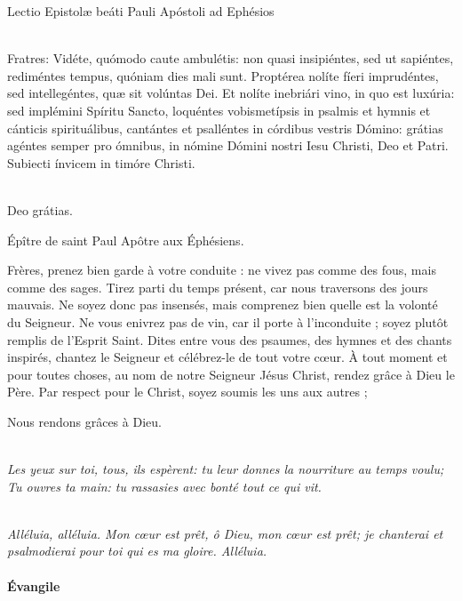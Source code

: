 \documentclass[twoside]{article}
\begin{document}
\begin{paracol}{2}
Lectio Epistolæ beáti Pauli Apóstoli ad Ephésios

\\
Fratres: Vidéte, quómodo caute ambulétis: non quasi insipiéntes, sed ut sapiéntes, rediméntes tempus, quóniam dies mali sunt. Proptérea nolíte fíeri imprudéntes, sed intellegéntes, quæ sit volúntas Dei. Et nolíte inebriári vino, in quo est luxúria: sed implémini Spíritu Sancto, loquéntes vobismetípsis in psalmis et hymnis et cánticis spirituálibus, cantántes et psalléntes in córdibus vestris Dómino: grátias agéntes semper pro ómnibus, in nómine Dómini nostri Iesu Christi, Deo et Patri. Subiecti ínvicem in timóre Christi.

\\
\rr Deo grátias.

\switchcolumn
Épître de saint Paul Apôtre aux Éphésiens.

Frères, prenez bien garde à votre conduite : ne vivez pas comme des fous, mais comme des sages.
Tirez parti du temps présent, car nous traversons des jours mauvais.
Ne soyez donc pas insensés, mais comprenez bien quelle est la volonté du Seigneur.
Ne vous enivrez pas de vin, car il porte à l’inconduite ; soyez plutôt remplis de l’Esprit Saint.
Dites entre vous des psaumes, des hymnes et des chants inspirés, chantez le Seigneur et célébrez-le de tout votre cœur.
À tout moment et pour toutes choses, au nom de notre Seigneur Jésus Christ, rendez grâce à Dieu le Père.
Par respect pour le Christ, soyez soumis les uns aux autres ;

\rr Nous rendons grâces à Dieu.

\end{paracol}


\\
\emph{\rr Les yeux sur toi, tous, ils espèrent: tu leur donnes la nourriture au temps voulu;\\
\vv Tu ouvres ta main: tu rassasies avec bonté tout ce qui vit.}


\\
\emph{Alléluia, alléluia. Mon cœur est prêt, ô Dieu, mon cœur est prêt; je chanterai et psalmodierai pour toi qui es ma gloire. Alléluia.}

\paragraph{Évangile}
\end{document}
